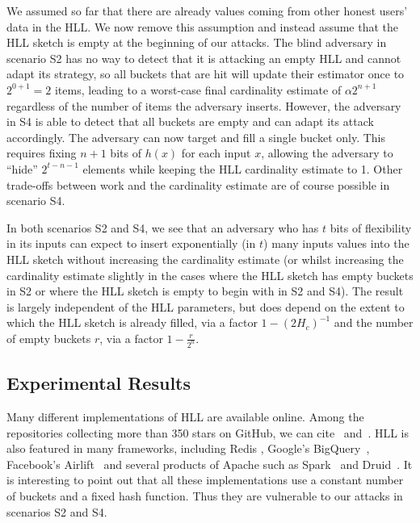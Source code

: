 \documentclass{IEEEtran}
\begin{document}
We assumed so far that there are already values coming from other honest users' data in the HLL. We now remove this assumption and instead assume that the HLL sketch is empty at the beginning of our attacks. The blind adversary in scenario S2 has no way to detect that it is attacking an empty HLL and cannot adapt its strategy, so all buckets that are hit will update their estimator once to $2^{0+1}=2$ items, leading to a worst-case final cardinality estimate of $\alpha2^{n+1}$ regardless of the number of items the adversary inserts. However, the adversary in S4 is able to detect that all buckets are empty and can adapt its attack accordingly. The adversary can now target and fill a single bucket only. This requires fixing $n+1$ bits of $h(x)$ for each input $x$, allowing the adversary to ``hide'' $2^{t-n-1}$ elements while keeping the HLL cardinality estimate to 1. Other trade-offs between work and the cardinality estimate are of course possible in scenario S4.

In both scenarios S2 and S4, we see that an adversary who has $t$ bits of flexibility in its inputs can expect to insert exponentially (in $t$) many inputs values into the HLL sketch without increasing the cardinality estimate (or whilst increasing the cardinality estimate slightly in the cases where the HLL sketch has empty buckets in S2 or where the HLL sketch is empty to begin with in S2 and S4). The result is largely independent of the HLL parameters, but does depend on the extent to which the HLL sketch is already filled, via a factor $1-(2H_c)^{-1}$ and the number of empty buckets $r$, via a factor $1- \frac{r}{2^n}$.


\subsection{Experimental Results}
Many different implementations of HLL are available online. Among the repositories collecting more than 350 stars on GitHub, we can cite~\cite{clahll} and~\cite{datasketch}. HLL is also featured in many frameworks, including Redis \cite{redis}, Google's BigQuery~\cite{bigquery}, Facebook's Airlift~\cite{airlift} and several products of Apache such as Spark~\cite{spahll} and Druid~\cite{druhll}. It is interesting to point out that all these implementations use a constant number of buckets and a fixed hash function. Thus they are vulnerable to our attacks in scenarios S2 and S4.
\end{document}

